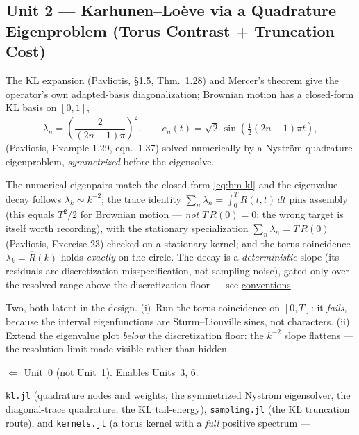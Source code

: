 \documentclass[11pt]{article}
\newcommand{\pav}[1]{{\small\color{hubblue}(Pavliotis, #1)}}
\newenvironment{brief}{%
  \begin{description}[style=sameline,leftmargin=2.3cm,font=\bfseries\color{hubblue}]
}{%
  \end{description}
}
\begin{document}
\subsection*{Unit 2 --- Karhunen--Lo\`eve via a Quadrature Eigenproblem (Torus Contrast + Truncation Cost)}
\begin{brief}
\item[Idea] The KL expansion \pav{\S1.5, Thm.~1.28} and Mercer's theorem give the operator's own
adapted-basis diagonalization; Brownian motion has a closed-form KL basis on $[0,1]$,
\begin{equation}
\lambda_n = \left(\frac{2}{(2n-1)\pi}\right)^{2}, \qquad
e_n(t) = \sqrt{2}\,\sin\!\left(\tfrac{1}{2}(2n-1)\pi t\right),
\label{eq:bm-kl}
\end{equation}
\pav{Example 1.29, eqn.~1.37} solved numerically by a Nystr\"om quadrature eigenproblem,
\emph{symmetrized} before the eigensolve.
\item[Proves] The numerical eigenpairs match the closed form \eqref{eq:bm-kl} and the eigenvalue decay
follows $\lambda_k\sim k^{-2}$; the trace identity $\sum_n\lambda_n = \int_0^T R(t,t)\,dt$ pins
assembly (this equals $T^2/2$ for Brownian motion --- \emph{not} $T\,R(0)=0$; the wrong target is
itself worth recording), with the stationary specialization $\sum_n\lambda_n=T\,R(0)$
\pav{Exercise 23} checked on a stationary kernel; and the torus coincidence $\lambda_k=\hat R(k)$
holds \emph{exactly} on the circle. The decay is a \emph{deterministic} slope (its residuals are
discretization misspecification, not sampling noise), gated only over the resolved range above the
discretization floor --- see \hyperref[sec:conv]{conventions}.
\item[Falsifier] Two, both latent in the design. (i)~Run the torus coincidence on $[0,T]$: it
\emph{fails}, because the interval eigenfunctions are Sturm--Liouville sines, not characters. (ii)~
Extend the eigenvalue plot \emph{below} the discretization floor: the $k^{-2}$ slope flattens --- the
resolution limit made visible rather than hidden.
\item[Depends on / enables] $\Leftarrow$ Unit~0 (not Unit~1). Enables Units~3, 6.
\item[Deliverable shape] \texttt{kl.jl} (quadrature nodes and weights, the symmetrized Nystr\"om
eigensolver, the diagonal-trace quadrature, the KL tail-energy), \texttt{sampling.jl} (the KL
truncation route), and \texttt{kernels.jl} (a torus kernel with a \emph{full} positive spectrum ---

\end{brief}
\end{document}
